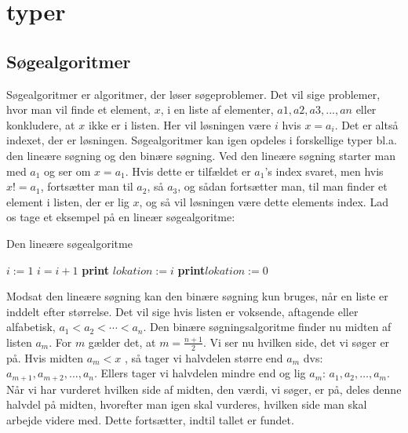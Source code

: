 \section{typer}
\subsection{Søgealgoritmer}
Søgealgoritmer er algoritmer, der løser søgeproblemer. Det vil sige problemer, hvor man vil finde et element, $x$, i en liste af elementer, $a1, a2, a3, ..., an$ eller konkludere, at $x$ ikke er i listen. Her vil løsningen være $i$ hvis $x=a_{i}$. Det er altså indexet, der er løsningen. Søgealgoritmer kan igen opdeles i forskellige typer bl.a. den lineære søgning og den binære søgning. Ved den lineære søgning starter man med $a_1$ og ser om $x=a_{1}$. Hvis dette er tilfældet er $a_{1}$'s index svaret, men hvis $x!=a_{1}$, fortsætter man til $a_{2}$, så $a_{3}$, og sådan fortsætter man, til man finder et element i listen, der er lig $x$, og så vil løsningen være dette elements index. Lad os tage et eksempel på en lineær søgealgoritme:

\begin{algorithm}[H]
\caption{Den lineære søgealgoritme}
\begin{algorithmic}[1]

    \State $i:=1$
        \State $i=i+1$
    \State \textbf{print} $lokation:=i$
    \Else
    \State \textbf{print}$lokation:=0$
    \EndIf
    \EndWhile  \label{roy's loop}
\EndProcedure

\end{algorithmic}
\end{algorithm}


Modsat den lineære søgning kan den binære søgning kun bruges, når en liste er inddelt efter størrelse. Det vil sige hvis listen er voksende, aftagende eller alfabetisk, $a_{1}<a_{2}<\dotsb<a_{n}$. Den binære søgningsalgoritme finder nu midten af listen $a_{m}$. For $m$ gælder det, at $m=\frac{n+1}{2}$. Vi ser nu hvilken side, det vi søger er på. Hvis midten $a_{m}<x$ , så tager vi halvdelen større end $a_{m}$ dvs: $a_{m+1}, a_{m+2},\dotsc,a_{n}$. Ellers tager vi halvdelen mindre end og lig $a_{m}$: $a_{1}, a_{2},\dotsc,a_{m}$. Når vi har vurderet hvilken side af midten, den værdi, vi søger, er på, deles denne halvdel på midten, hvorefter man igen skal vurderes, hvilken side man skal arbejde videre med. Dette fortsætter, indtil tallet er fundet. 

